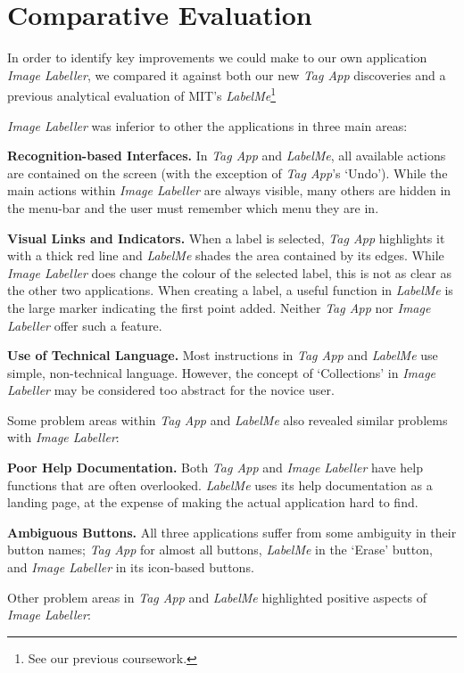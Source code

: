 \documentclass[11pt,twocolumn]{article}
\begin{document}
\section{Comparative Evaluation}

In order to identify key improvements we could make to our own application
\emph{Image Labeller}, we compared it against both our new \emph{Tag App} discoveries and a
previous analytical evaluation of MIT’s \emph{LabelMe}\footnote{See our previous
coursework.}

\emph{Image Labeller} was inferior to other the applications in three main areas:

\textbf{Recognition-based Interfaces.} In \emph{Tag App} and \emph{LabelMe}, all
available actions are contained on the screen (with the exception of \emph{Tag App}’s
`Undo'). While the main actions within \emph{Image Labeller} are always visible, many
others are hidden in the menu-bar and the user must remember which menu they
are in. 

\textbf{Visual Links and Indicators.} When a label is selected, \emph{Tag App}
highlights it with a thick red line and \emph{LabelMe} shades the area contained by
its edges. While \emph{Image Labeller} does change the colour of the selected label,
this is not as clear as the other two applications. When creating a label, a
useful function in \emph{LabelMe} is the large marker indicating the first point
added. Neither \emph{Tag App} nor \emph{Image Labeller} offer such a feature.

\textbf{Use of Technical Language.} Most instructions in \emph{Tag App} and
\emph{LabelMe} use simple, non-technical language. However, the concept of
`Collections' in \emph{Image Labeller} may be considered too abstract for the novice
user.

Some problem areas within \emph{Tag App} and \emph{LabelMe} also revealed similar problems
with \emph{Image Labeller}:

\textbf{Poor Help Documentation.} Both \emph{Tag App} and \emph{Image Labeller} have
help functions that are often overlooked. \emph{LabelMe} uses its help documentation
as a landing page, at the expense of making the actual application hard to
find. 

\textbf{Ambiguous Buttons.} All three applications suffer from some
ambiguity in their button names; \emph{Tag App} for almost all buttons, \emph{LabelMe} in the
`Erase' button, and \emph{Image Labeller} in its icon-based buttons. 

Other problem areas in \emph{Tag App} and \emph{LabelMe} highlighted positive aspects of
\emph{Image Labeller}:
\end{document}
